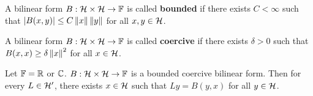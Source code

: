 \begin{definition}
    A bilinear form $B:\mathcal{H}\times\mathcal{H}\to\mathbb{F}$ is called \textbf{bounded} if 
    there exists $C<\infty$ such that $\left\lvert {B(x,y)} \right\rvert\leq C\left\lVert {x} \right\rVert\left\lVert {y} \right\rVert$ for 
    all $x,y\in\mathcal{H}$.
\end{definition}

\begin{definition}
    A bilinear form $B:\mathcal{H}\times\mathcal{H}\to\mathbb{F}$ is called \textbf{coercive} if 
    there exists $\delta>0$ such that $B(x,x)\geq \delta\left\lVert {x} \right\rVert^2$ for all 
    $x\in\mathcal{H}$.
\end{definition}

\begin{theorem}
    Let $\mathbb{F} = \mathbb{R}$ or $\mathbb{C}$. $B:\mathcal{H}\times\mathcal{H}\to\mathbb{F}$ is a bounded 
    coercive bilinear form. Then for every $L\in\mathcal{H}'$, there exists $x\in\mathcal{H}$ 
    such that $Ly = B(y,x)$ for all $y\in\mathcal{H}$.
\end{theorem}
